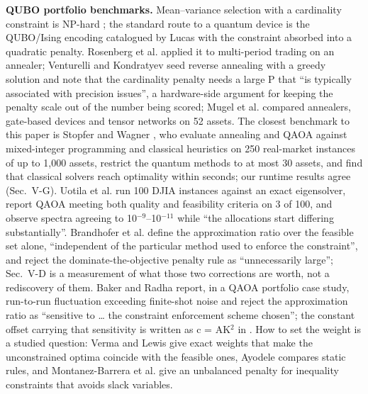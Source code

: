 \documentclass{ieeeaccess}
\begin{document}
\textbf{QUBO portfolio benchmarks.} Mean--variance selection \cite{ref1} with a cardinality constraint is NP-hard \cite{ref2}; the standard route to a quantum device is the QUBO/Ising encoding catalogued by Lucas \cite{ref3} with the constraint absorbed into a quadratic penalty. Rosenberg et al. \cite{ref12} applied it to multi-period trading on an annealer; Venturelli and Kondratyev \cite{ref13} seed reverse annealing with a greedy solution and note that the cardinality penalty needs a large P that ``is typically associated with precision issues'', a hardware-side argument for keeping the penalty scale out of the number being scored; Mugel et al. \cite{ref14} compared annealers, gate-based devices and tensor networks on 52 assets. The closest benchmark to this paper is Stopfer and Wagner \cite{ref8}, who evaluate annealing and QAOA against mixed-integer programming and classical heuristics on 250 real-market instances of up to 1,000 assets, restrict the quantum methods to at most 30 assets, and find that classical solvers reach optimality within seconds; our runtime results agree (Sec.~V-G). Uotila et al. \cite{ref15} run 100 DJIA instances against an exact eigensolver, report QAOA meeting both quality and feasibility criteria on 3 of 100, and observe spectra agreeing to 10$^{-9}$--10$^{-11}$ while ``the allocations start differing substantially''. Brandhofer et al. \cite{ref9} define the approximation ratio over the feasible set alone, ``independent of the particular method used to enforce the constraint'', and reject the dominate-the-objective penalty rule as ``unnecessarily large''; Sec.~V-D is a measurement of what those two corrections are worth, not a rediscovery of them. Baker and Radha \cite{ref10} report, in a QAOA portfolio case study, run-to-run fluctuation exceeding finite-shot noise and reject the approximation ratio as ``sensitive to \ldots{} the constraint enforcement scheme chosen''; the constant offset carrying that sensitivity is written as c = AK$^{2}$ in \cite{ref11}. How to set the weight is a studied question: Verma and Lewis \cite{ref16} give exact weights that make the unconstrained optima coincide with the feasible ones, Ayodele \cite{ref17} compares static rules, and Montanez-Barrera et al. \cite{ref18} give an unbalanced penalty for inequality constraints that avoids slack variables.
\end{document}

